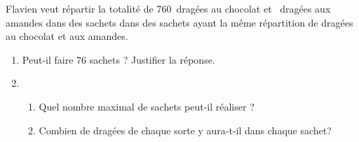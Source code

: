 
\medskip

Flavien veut répartir la totalité de 760~dragées au chocolat et ~dragées aux amandes dans des sachets dans des sachets ayant la même répartition de dragées au chocolat et aux amandes.

\medskip
 
\begin{enumerate}
\item Peut-il faire 76 sachets ? Justifier la réponse. 
\item 
	\begin{enumerate}
		\item Quel nombre maximal de sachets peut-il réaliser ? 
		\item Combien de dragées de chaque sorte y aura-t-il dans chaque sachet?
	\end{enumerate}
\end{enumerate}
 
\vspace{0,5cm}

